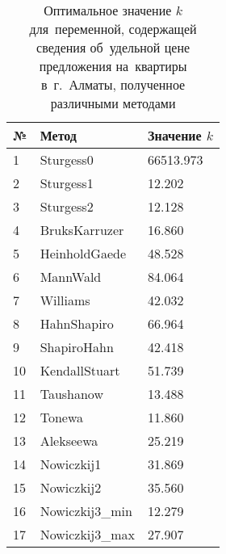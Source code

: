 \documentclass[]{scrartcl}
\begin{document}
\begin{table}[ht]
	\caption{Оптимальное значение $k$ для~переменной, содержащей сведения об~удельной цене предложения на~квартиры в~г.~Алматы, полученное различными методами} \label{tab:k-hist-optimal-almaty}
	\centering%
	\begin{tabularx}{\textwidth}{lXX} 
		\hline
		№  & Метод & Значение $k$ 
		\\ \hline \hline
	1 & Sturgess0 & 66513.973 \\ 
	2 & Sturgess1 & 12.202 \\ 
	3 & Sturgess2 & 12.128 \\ 
	4 & BruksKarruzer & 16.860 \\ 
	5 & HeinholdGaede & 48.528 \\ 
	6 & MannWald & 84.064 \\ 
	7 & Williams & 42.032 \\ 
	8 & HahnShapiro & 66.964 \\ 
	9 & ShapiroHahn & 42.418 \\ 
	10 & KendallStuart & 51.739 \\ 
	11 & Taushanow & 13.488 \\ 
	12 & Tonewa & 11.860 \\ 
	13 & Alekseewa & 25.219 \\ 
	14 & Nowiczkij1 & 31.869 \\ 
	15 & Nowiczkij2 & 35.560 \\ 
	16 & Nowiczkij3\_min & 12.279 \\ 
	17 & Nowiczkij3\_max & 27.907 \\
	\hline	
	\end{tabularx}
\end{table}
\end{document}
